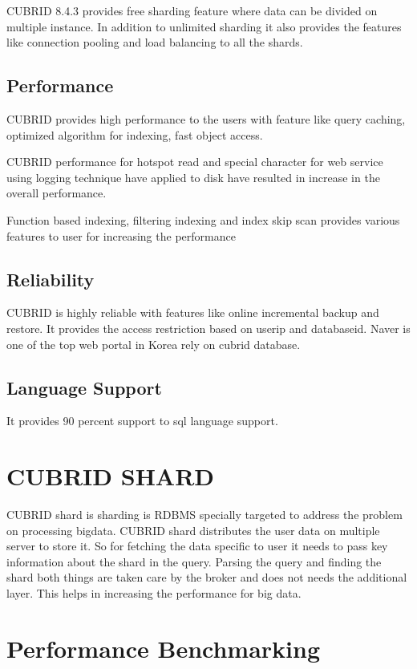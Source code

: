 \documentclass[9pt,twocolumn,twoside]{../../styles/osajnl}
\begin{document}
CUBRID 8.4.3 provides free sharding feature where data can be divided
on multiple instance.  In addition to unlimited sharding it also
provides the features like connection pooling and load balancing to
all the shards.

\subsection{Performance}

CUBRID provides high performance to the users with feature like query
caching, optimized algorithm for indexing, fast object access.

CUBRID performance for hotspot read and special character for web service using 
logging technique have applied to disk have resulted in increase in the overall 
performance. 

Function based indexing, filtering indexing and index skip scan
provides various features to user for increasing the performance

\subsection{Reliability}

CUBRID is highly reliable with features like online incremental backup
and restore.  It provides the access restriction based on userip and
databaseid. Naver is one of the top web portal in Korea rely on 
cubrid database.

\subsection{Language Support}
It provides 90 percent support to sql language support. 


\section{CUBRID SHARD}

CUBRID shard is sharding is RDBMS specially targeted to address the
problem on processing bigdata. CUBRID shard distributes the user data
on multiple server to store it. So for fetching the data specific to
user it needs to pass key information about the shard in the
query. Parsing the query and finding the shard both things are taken
care by the broker and does not needs the additional layer. This helps
in increasing the performance for big data. 


\section{Performance Benchmarking}
\end{document}
